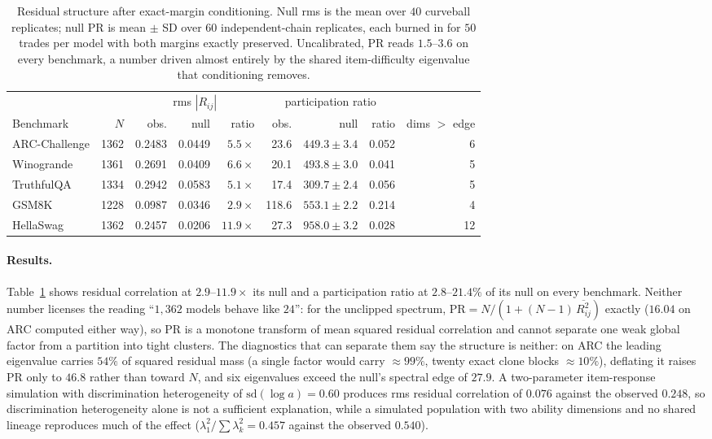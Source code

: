 \documentclass{article}
\begin{document}
\begin{table}[t]
\centering
\small
\begin{tabular}{lrrrrrrrr}
\toprule
 & & \multicolumn{3}{c}{rms $|R_{ij}|$} & \multicolumn{3}{c}{participation ratio} & \\
\cmidrule(lr){3-5}\cmidrule(lr){6-8}
Benchmark & $N$ & obs. & null & ratio & obs. & null & ratio & dims $>$ edge \\
\midrule
ARC-Challenge & 1362 & 0.2483 & 0.0449 & $5.5\times$ & 23.6 & $449.3\pm3.4$ & 0.052 & 6 \\
Winogrande    & 1361 & 0.2691 & 0.0409 & $6.6\times$ & 20.1 & $493.8\pm3.0$ & 0.041 & 5 \\
TruthfulQA    & 1334 & 0.2942 & 0.0583 & $5.1\times$ & 17.4 & $309.7\pm2.4$ & 0.056 & 5 \\
GSM8K         & 1228 & 0.0987 & 0.0346 & $2.9\times$ & 118.6 & $553.1\pm2.2$ & 0.214 & 4 \\
HellaSwag     & 1362 & 0.2457 & 0.0206 & $11.9\times$ & 27.3 & $958.0\pm3.2$ & 0.028 & 12 \\
\bottomrule
\end{tabular}
\caption{Residual structure after exact-margin conditioning. Null rms is the mean over $40$
curveball replicates; null PR is mean $\pm$ SD over $60$ independent-chain replicates, each burned
in for $50$ trades per model with both margins exactly preserved. Uncalibrated, PR reads
$1.5$--$3.6$ on every benchmark, a number driven almost entirely by the shared item-difficulty
eigenvalue that conditioning removes.}
\label{tab:neff}
\end{table}


\paragraph{Results.} Table~\ref{tab:neff} shows residual correlation at $2.9$--$11.9\times$ its
null and a participation ratio at $2.8$--$21.4\%$ of its null on every benchmark. Neither number
licenses the reading ``$1{,}362$ models behave like $24$'': for the unclipped spectrum,
$\mathrm{PR}=N/(1+(N-1)\,\overline{R_{ij}^2})$ exactly ($16.04$ on ARC computed either way), so
PR is a monotone transform of mean squared residual correlation and cannot separate one weak
global factor from a partition into tight clusters. The diagnostics that can separate them say the
structure is neither: on ARC the leading eigenvalue carries $54\%$ of squared residual mass (a
single factor would carry $\approx99\%$, twenty exact clone blocks $\approx10\%$), deflating it
raises PR only to $46.8$ rather than toward $N$, and six eigenvalues exceed the null's spectral
edge of $27.9$. A two-parameter item-response simulation with discrimination heterogeneity of
$\mathrm{sd}(\log a)=0.60$ produces rms residual correlation of $0.076$ against the observed
$0.248$, so discrimination heterogeneity alone is not a sufficient explanation, while a simulated
population with two ability dimensions and no shared lineage reproduces much of the effect
($\lambda_1^2/\sum\lambda_k^2=0.457$ against the observed $0.540$).
\end{document}
